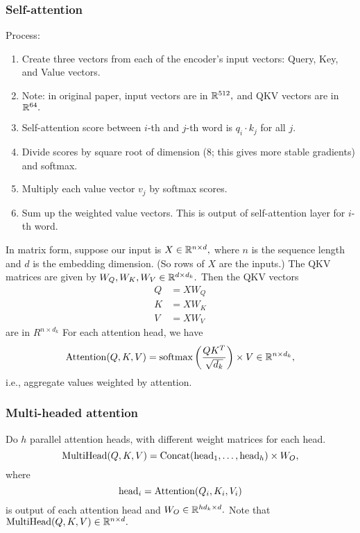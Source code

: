 \documentclass[../ds]{subfiles}
\begin{document}
\subsubsection{Self-attention}
Process:
\begin{enumerate}
\item Create three vectors from each of the encoder’s input vectors: Query, Key, and Value vectors.

\item Note: in original paper, input vectors are in $\mathbb{R}^{512},$ and QKV vectors are in $\mathbb{R}^{64}.$

\item Self-attention score between $i$-th and $j$-th word is $q_i \cdot k_j$ for all $j.$

\item Divide scores by square root of dimension (8; this gives more stable gradients) and softmax.

\item Multiply each value vector $v_j$ by softmax scores.

\item Sum up the weighted value vectors. This is output of self-attention layer for $i$-th word.
\end{enumerate}
In matrix form, suppose our input is $X \in \mathbb{R}^{n \times d},$ where $n$ is the sequence length and $d$ is the embedding dimension. (So rows of $X$ are the inputs.) The QKV matrices are given by $W_Q, W_K, W_V \in \mathbb{R}^{d \times d_k}.$ Then the QKV vectors
\begin{align*}
    Q &= XW_Q \\
    K &= XW_K \\
    V &= XW_V
\end{align*}
are in $R^{n \times d_k}$
For each attention head, we have
\[ \operatorname{Attention}(Q,K,V) = \operatorname{softmax}\left(\frac{QK^T}{\sqrt{d_k}}\right) \times V \in \mathbb{R}^{n \times d_k}, \]
i.e., aggregate values weighted by attention.

\subsubsection{Multi-headed attention}
Do $h$ parallel attention heads, with different weight matrices for each head.
\[ \operatorname{MultiHead}(Q, K, V) = \operatorname{Concat}(\operatorname{head}_1, \ldots, \operatorname{head}_h) \times W_O, \]
where
\[ \operatorname{head}_i = \operatorname{Attention}(Q_i, K_i, V_i) \]
is output of each attention head and $W_O \in \mathbb{R}^{hd_k \times d}.$ Note that $\operatorname{MultiHead}(Q, K, V) \in \mathbb{R}^{n \times d}.$ 
\end{document}
